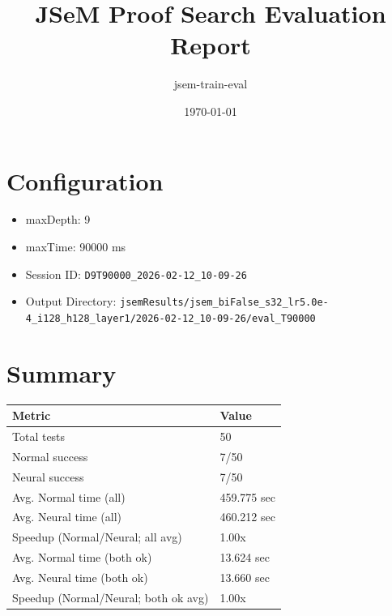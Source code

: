 \documentclass[a4paper,10pt]{article}
\title{JSeM Proof Search Evaluation Report}
\author{jsem-train-eval}
\date{\today}
\begin{document}
\maketitle

\section{Configuration}
\begin{itemize}
\item maxDepth: 9
\item maxTime: 90000 ms
\item Session ID: \texttt{D9T90000\_2026-02-12\_10-09-26}
\item Output Directory: \texttt{jsemResults/jsem\_biFalse\_s32\_lr5.0e-4\_i128\_h128\_layer1/2026-02-12\_10-09-26/eval\_T90000}
\end{itemize}

\section{Summary}
\begin{tabular}{ll}
\toprule
\textbf{Metric} & \textbf{Value} \\
\midrule
Total tests & 50 \\
Normal success & 7/50 \\
Neural success & 7/50 \\
\midrule
Avg. Normal time (all) & 459.775 sec \\
Avg. Neural time (all) & 460.212 sec \\
Speedup (Normal/Neural; all avg) & 1.00x \\
Avg. Normal time (both ok) & 13.624 sec \\
Avg. Neural time (both ok) & 13.660 sec \\
Speedup (Normal/Neural; both ok avg) & 1.00x \\
\bottomrule
\end{tabular}
\end{document}
